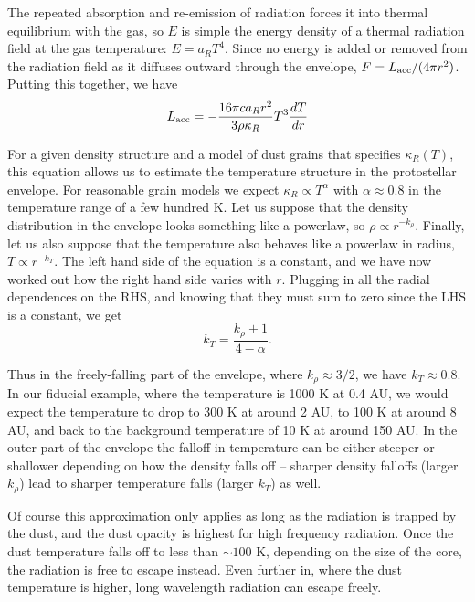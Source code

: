 The repeated absorption and re-emission of radiation forces it into thermal equilibrium with the gas, so $E$ is simple the energy density of a thermal radiation field at the gas temperature: $E=a_R T^4$. Since no energy is added or removed from the radiation field as it diffuses outward through the envelope, $F=L_{\rm acc}/(4\pi r^2)$. Putting this together, we have
\begin{equation}
L_{\rm acc}=-\frac{16\pi ca_R r^2}{3\rho\kappa_R} T^3 \frac{dT}{dr}
\end{equation}

For a given density structure and a model of dust grains that specifies $\kappa_R(T)$, this equation allows us to estimate the temperature structure in the protostellar envelope. For reasonable grain models we expect $\kappa_R\propto T^\alpha$ with $\alpha\approx 0.8$ in the temperature range of a few hundred K. Let us suppose that the density distribution in the envelope looks something like a powerlaw, so $\rho\propto r^{-k_{\rho}}$. Finally, let us also suppose that the temperature also behaves like a powerlaw in radius, $T\propto r^{-k_T}$. The left hand side of the equation is a constant, and we have now worked out how the right hand side varies with $r$. Plugging in all the radial dependences on the RHS, and knowing that they must sum to zero since the LHS is a constant, we get
\begin{equation}
k_T = \frac{k_{\rho} + 1}{4-\alpha}.
\end{equation}

Thus in the freely-falling part of the envelope, where $k_{\rho}\approx 3/2$, we have $k_T\approx 0.8$. In our fiducial example, where the temperature is 1000 K at 0.4 AU, we would expect the temperature to drop to 300 K at around 2 AU, to 100 K at around 8 AU, and back to the background temperature of 10 K at around 150 AU. In the outer part of the envelope the falloff in temperature can be either steeper or shallower depending on how the density falls off -- sharper density falloffs (larger $k_{\rho}$) lead to sharper temperature falls (larger $k_T$) as well.

Of course this approximation only applies as long as the radiation is trapped by the dust, and the dust opacity is highest for high frequency radiation. Once the dust temperature falls off to less than $\sim 100$ K, depending on the size of the core, the radiation is free to escape instead. Even further in, where the dust temperature is higher, long wavelength radiation can escape freely.

